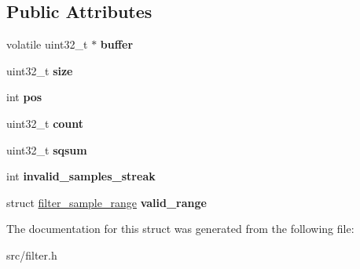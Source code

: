\subsection*{Public Attributes}
\begin{DoxyCompactItemize}
\item 
\hypertarget{structfilter__rms_a54520c4d0cb0f9441f4c57eacf5bfd78}{}volatile uint32\+\_\+t $\ast$ {\bfseries buffer}\label{structfilter__rms_a54520c4d0cb0f9441f4c57eacf5bfd78}

\item 
\hypertarget{structfilter__rms_a8581be35641ea200e6bf23ce48f76196}{}uint32\+\_\+t {\bfseries size}\label{structfilter__rms_a8581be35641ea200e6bf23ce48f76196}

\item 
\hypertarget{structfilter__rms_a85d467406ed373c2ad1a134860fd24bd}{}int {\bfseries pos}\label{structfilter__rms_a85d467406ed373c2ad1a134860fd24bd}

\item 
\hypertarget{structfilter__rms_a42976cc476c577216f312bcd496eb79b}{}uint32\+\_\+t {\bfseries count}\label{structfilter__rms_a42976cc476c577216f312bcd496eb79b}

\item 
\hypertarget{structfilter__rms_a902e6aa671bf468ba0506ef5848f51cf}{}uint32\+\_\+t {\bfseries sqsum}\label{structfilter__rms_a902e6aa671bf468ba0506ef5848f51cf}

\item 
\hypertarget{structfilter__rms_a00a96dc7cf61e9c2643fdefc3d558ff2}{}int {\bfseries invalid\+\_\+samples\+\_\+streak}\label{structfilter__rms_a00a96dc7cf61e9c2643fdefc3d558ff2}

\item 
\hypertarget{structfilter__rms_abcd2a21aa49c2abb148493265da1efa5}{}struct \hyperlink{structfilter__sample__range}{filter\+\_\+sample\+\_\+range} {\bfseries valid\+\_\+range}\label{structfilter__rms_abcd2a21aa49c2abb148493265da1efa5}

\end{DoxyCompactItemize}


The documentation for this struct was generated from the following file\+:\begin{DoxyCompactItemize}
\item 
src/filter.\+h\end{DoxyCompactItemize}

